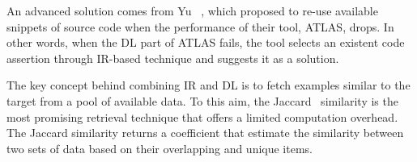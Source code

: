 An advanced solution comes from Yu \etal~\cite{yu2022automated}, which proposed to re-use available snippets of source code when the performance of their tool, \textsc{ATLAS}, drops. In other words, when the DL part of \textsc{ATLAS} fails, the tool selects an existent code assertion through IR-based technique and suggests it as a solution.

The key concept behind combining IR and DL is to fetch examples similar to the target from a pool of available data. To this aim, the Jaccard~\cite{tanimoto1958elementary} similarity is the most promising retrieval technique that offers a limited computation overhead. The Jaccard similarity returns a coefficient that estimate the similarity between two sets of data based on their overlapping and unique items.

